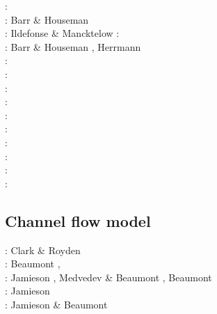 \begin{scriptsize}
\nineteenseventyone: \cite{stbe71}\\
\nineteenninetytwo: Barr \& Houseman \cite{baho92}\\
\nineteenninetythree: Ildefonse \& Mancktelow \cite{ilma93}
\nineteenninetyfive: \cite{fige95}\\
\nineteenninetysix: Barr \& Houseman \cite{baho96}, Herrmann \etal \cite{hept96}\\
\twothousand: \cite{acgf00}\cite{trla00}\\
\twothousandone: \cite{masc01}\\
\twothousandeight: \cite{manc08}\cite{scsf08}\\
\twothousandeleven: \cite{frem11}\\
\twothousandthirteen: \cite{soma13}\cite{lehl13}\\
\twothousandfourteen: \cite{olbm14}\\
\twothousandfifteen: \cite{pevp15}\cite{jalr15}\\
\twothousandseventeen: \cite{naam17}\cite{scdu17}\\
\twothousandeighteen: \cite{naam18}\\
\twothousandnineteen: \cite{llor19}\cite{yada19}\cite{sogh19}
\end{scriptsize}

\subsection{Channel flow model} 

\begin{scriptsize}
\twothousand: Clark \& Royden \cite{clro00}\\
\twothousandfour: Beaumont \etal \cite{bejn04}, \cite{jabm04}\\
\twothousandsix: Jamieson \etal \cite{jabn06}, Medvedev \& Beaumont \cite{mebe06}, 
                 Beaumont \etal \cite{benj06}\\
\twothousandseven: Jamieson \etal \cite{jabn07}\\
\twothousandeleven: Jamieson \& Beaumont \cite{jabe11}
\end{scriptsize}

